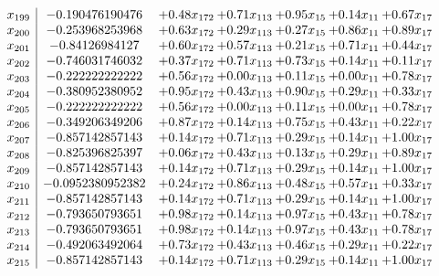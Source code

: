 \documentclass[8pt]{article}
\begin{document}
\[\begin{array}{c| c c@{\hskip 2pt} c@{\hskip 2pt} c@{\hskip 2pt} c@{\hskip 2pt} c@{\hskip 2pt} }
 x_{199}   &  -0.190476190476 & +  0.48 x_{172} & +  0.71 x_{113} & +  0.95 x_{15} & +  0.14 x_{11} & +  0.67 x_{17}\\
 x_{200}   &  -0.253968253968 & +  0.63 x_{172} & +  0.29 x_{113} & +  0.27 x_{15} & +  0.86 x_{11} & +  0.89 x_{17}\\
 x_{201}   &  -0.84126984127 & +  0.60 x_{172} & +  0.57 x_{113} & +  0.21 x_{15} & +  0.71 x_{11} & +  0.44 x_{17}\\
 x_{202}   &  -0.746031746032 & +  0.37 x_{172} & +  0.71 x_{113} & +  0.73 x_{15} & +  0.14 x_{11} & +  0.11 x_{17}\\
 x_{203}   &  -0.222222222222 & +  0.56 x_{172} & +  0.00 x_{113} & +  0.11 x_{15} & +  0.00 x_{11} & +  0.78 x_{17}\\
 x_{204}   &  -0.380952380952 & +  0.95 x_{172} & +  0.43 x_{113} & +  0.90 x_{15} & +  0.29 x_{11} & +  0.33 x_{17}\\
 x_{205}   &  -0.222222222222 & +  0.56 x_{172} & +  0.00 x_{113} & +  0.11 x_{15} & +  0.00 x_{11} & +  0.78 x_{17}\\
 x_{206}   &  -0.349206349206 & +  0.87 x_{172} & +  0.14 x_{113} & +  0.75 x_{15} & +  0.43 x_{11} & +  0.22 x_{17}\\
 x_{207}   &  -0.857142857143 & +  0.14 x_{172} & +  0.71 x_{113} & +  0.29 x_{15} & +  0.14 x_{11} & +  1.00 x_{17}\\
 x_{208}   &  -0.825396825397 & +  0.06 x_{172} & +  0.43 x_{113} & +  0.13 x_{15} & +  0.29 x_{11} & +  0.89 x_{17}\\
 x_{209}   &  -0.857142857143 & +  0.14 x_{172} & +  0.71 x_{113} & +  0.29 x_{15} & +  0.14 x_{11} & +  1.00 x_{17}\\
 x_{210}   &  -0.0952380952382 & +  0.24 x_{172} & +  0.86 x_{113} & +  0.48 x_{15} & +  0.57 x_{11} & +  0.33 x_{17}\\
 x_{211}   &  -0.857142857143 & +  0.14 x_{172} & +  0.71 x_{113} & +  0.29 x_{15} & +  0.14 x_{11} & +  1.00 x_{17}\\
 x_{212}   &  -0.793650793651 & +  0.98 x_{172} & +  0.14 x_{113} & +  0.97 x_{15} & +  0.43 x_{11} & +  0.78 x_{17}\\
 x_{213}   &  -0.793650793651 & +  0.98 x_{172} & +  0.14 x_{113} & +  0.97 x_{15} & +  0.43 x_{11} & +  0.78 x_{17}\\
 x_{214}   &  -0.492063492064 & +  0.73 x_{172} & +  0.43 x_{113} & +  0.46 x_{15} & +  0.29 x_{11} & +  0.22 x_{17}\\
 x_{215}   &  -0.857142857143 & +  0.14 x_{172} & +  0.71 x_{113} & +  0.29 x_{15} & +  0.14 x_{11} & +  1.00 x_{17}\\

\end{array}\]
\end{document}
